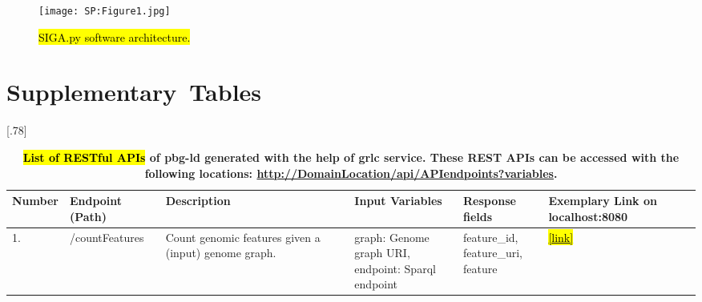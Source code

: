 \documentclass[applsci,article,accept,moreauthors,pdftex]{Definitions/mdpi}
\begin{document}
{%

\begin{figure}[H]
\centering
\texttt{[image: SP:Figure1.jpg]} %
\caption{\hl{SIGA.py software architecture.}} 
\label{SP:Figure1}
\end{figure} 

\section{Supplementary~Tables}
\vspace{-3mm}

\begin{table}[H]
\centering
\caption{\textbf{\hl{List of RESTful APIs} %
 of pbg-ld {generated} with the help of  grlc service. These REST APIs can be accessed with the following locations: \url{http://DomainLocation/api/APIendpoints?variables}.}}
\label{SP:Table1}
\scalebox{.78}[.78]{\begin{tabular}{m{1.2cm}<{\raggedright}m{3cm}<{\raggedright}m{3.5cm}<{\raggedright}m{4.5cm}<{\raggedright}m{3cm}<{\raggedright}m{1.8cm}<{\raggedright}}
\toprule
\textbf{Number} & \textbf{Endpoint (Path)} & \textbf{Description} & \textbf{Input Variables} & \textbf{Response fields} &  \textbf{Exemplary Link on localhost:8080}  \\
\midrule
1. & /countFeatures & Count genomic features given a (input) genome graph. & \makecell[l]{graph: Genome graph URI, \\
endpoint: Sparql endpoint} & \makecell[l]{feature{\_}id, \\  feature{\_}uri, \\ feature} &  \href{http://localhost:8080/api/candYgene/queries/countFeatures?graph=http://plants.ensembl.org/Solanum_lycopersicum}{\hl{[link]} %
}  \\ %


\end{tabular}}
\end{table}}
\end{document}
